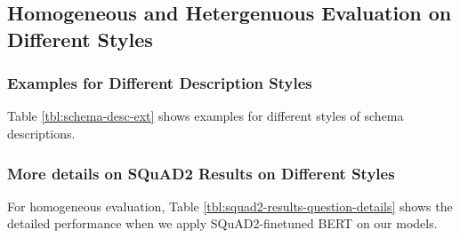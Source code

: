 \subsection{Homogeneous and Hetergenuous Evaluation on Different Styles}
\label{ssec:more-desc-results}

\subsubsection{Examples for Different Description Styles}
\label{sssec:appendices-example-style}
Table \ref{tbl:schema-desc-ext} shows examples for different styles of schema descriptions.

\subsubsection{More details on SQuAD2 Results on Different Styles}
\label{sssec:squad2_homo}
For homogeneous evaluation, Table
\ref{tbl:squad2-results-question-details} shows the detailed
performance when we apply SQuAD2-finetuned BERT on our models.
